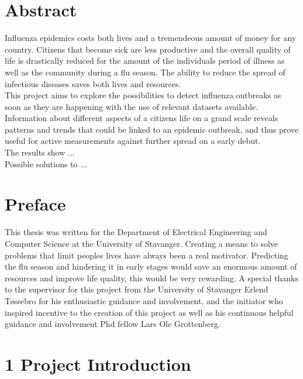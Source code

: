 \documentclass[11pt]{report}
\begin{document}


\chapter*{Abstract}
Influenza epidemics costs both lives and a tremendeous amount of money for any country. Citizens that become sick are less productive and the overall quality of life is drastically reduced for the amount of the individuals period of illness as well as the community during a flu season. The ability to reduce the spread of infectious diseases saves both lives and resources. \\

This project aims to explore the possibilities to detect influenza outbreaks as soon as they are happening with the use of relevant datasets available. Information about different aspects of a citizens life on a grand scale reveals patterns and trends that could be linked to an epidemic outbreak, and thus prove useful for active measurements against further spread on a early debut. \\

The results show ...\\

Possible solutions to ...

\chapter*{Preface}
This thesis was written for the Department of Electrical Engineering and Computer Science at the University of Stavanger. Creating a means to solve  problems that limit peoples lives have always been a real motivator. Predicting the flu season and hindering it in early stages would save an enormous amount of resources and improve life quality, this would be very rewarding. A special thanks to the supervisor for this project from the University of Stavanger Erlend Tøssebro for his enthusiastic guidance and involvement, and the initiator who inspired incentive to the creation of this project as well as his continuous helpful guidance and involvement Phd fellow Lars Ole Grottenberg. 

\tableofcontents{}
\chapter*{\vspace{-3cm}1 Project Introduction}
\end{document}
